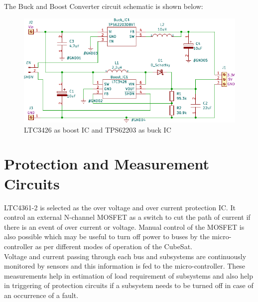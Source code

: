 The Buck and Boost Converter circuit schematic is shown below:
\begin{figure}[ht]
	\centering
	\includegraphics[width=\columnwidth]{1.pdf}
	\caption{LTC3426 as boost IC and TPS62203 as buck IC}
	\label{fig:bubo}
\end{figure}



\section[Protection Circuits]{Protection and Measurement Circuits}


LTC4361-2 is selected as the over voltage and over current protection IC. It control an external N-channel MOSFET as a switch to cut the path of current if there is an event of over current or voltage. Manual control of the MOSFET is also possible which may be useful to turn off power to buses by the micro-controller as per different modes of operation of the CubeSat.
\\

 Voltage and current passing through each bus and subsystems are continuously monitored by sensors and this information is fed to the micro-controller. These measurements help in estimation of load requirement of subsystems and also help in triggering of protection circuits if a subsystem needs to be turned off in case of an occurrence of a fault. 
 \\
 
